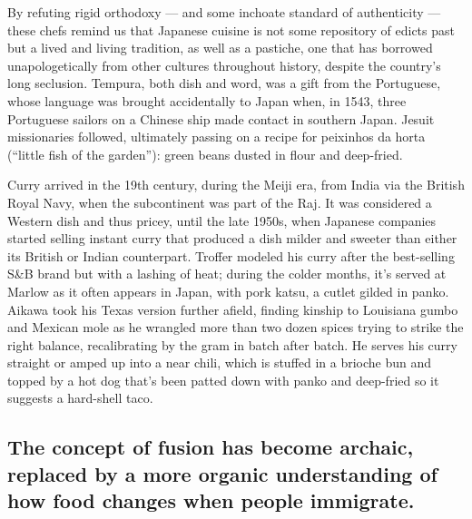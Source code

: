 By refuting rigid orthodoxy --- and some inchoate standard of
authenticity --- these chefs remind us that Japanese cuisine is not some
repository of edicts past but a lived and living tradition, as well as a
pastiche, one that has borrowed unapologetically from other cultures
throughout history, despite the country's long seclusion. Tempura, both
dish and word, was a gift from the Portuguese, whose language was
brought accidentally to Japan when, in 1543, three Portuguese sailors on
a Chinese ship made contact in southern Japan. Jesuit missionaries
followed, ultimately passing on a recipe for peixinhos da horta
(``little fish of the garden''): green beans dusted in flour and
deep-fried.

Curry arrived in the 19th century, during the Meiji era, from India via
the British Royal Navy, when the subcontinent was part of the Raj. It
was considered a Western dish and thus pricey, until the late 1950s,
when Japanese companies started selling instant curry that produced a
dish milder and sweeter than either its British or Indian counterpart.
Troffer modeled his curry after the best-selling S\&B brand but with a
lashing of heat; during the colder months, it's served at Marlow as it
often appears in Japan, with pork katsu, a cutlet gilded in panko.
Aikawa took his Texas version further afield, finding kinship to
Louisiana gumbo and Mexican mole as he wrangled more than two dozen
spices trying to strike the right balance, recalibrating by the gram in
batch after batch. He serves his curry straight or amped up into a near
chili, which is stuffed in a brioche bun and topped by a hot dog that's
been patted down with panko and deep-fried so it suggests a hard-shell
taco.

\hypertarget{the-concept-of-fusion-has-become-archaic-replaced-by-a-more-organic-understanding-of-how-food-changes-when-people-immigrate}{%
\subsection{The concept of fusion has become archaic, replaced by a more
organic understanding of how food changes when people
immigrate.}\label{the-concept-of-fusion-has-become-archaic-replaced-by-a-more-organic-understanding-of-how-food-changes-when-people-immigrate}}

